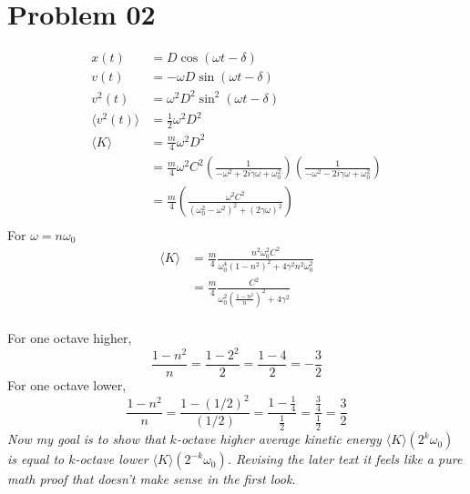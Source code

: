 \documentclass[12pt,letter]{article}
\begin{document}
\section*{Problem 02}
\begin{align*}
x(t)	&=  D \cos \left( \omega t - \delta \right)\\
v(t) &= - \omega D \sin( \omega t - \delta ) \\
v^2(t) &= \omega^2 D^2 \sin ^2 \left( \omega t - \delta \right) \\
\langle v^2 (t) \rangle &= \frac{1}{2 } \omega ^2 D ^2  \\
\langle K \rangle &= \frac{m}{4} \omega^2 D^2 \\ 
&= \frac{m}{4} \omega ^2 C^2 \left(\frac{1}{- \omega^2 + 2 i \gamma \omega + \omega_0^2} \right) \left(\frac{1}{- \omega^2 - 2 i \gamma \omega + \omega_0^2}\right)\\
&= \boxed{
 \frac{m}{4} \left(\frac{\omega ^2 C^2 }{(\omega_0^2 - \omega^2 )^2 + \left(2  \gamma \omega\right) ^2}\right) }\\
\end{align*}
For $\omega = n \omega_0$ 
\begin{align*}
	\langle K \rangle &= \frac{m}{4}
 \frac{n^2 \omega_0 ^2 C^2}{\omega_0^{4} \left(1 - n^2\right) ^2 + 4 \gamma^2 n^2 \omega_0 ^2}
	\\ &= \frac{m}{4} \frac{C^2}{\omega_0^2 \left(\frac{1 - n^2}{n}\right)^2 + 4 \gamma^2 } \\
\end{align*}

For one octave higher, 
\[
\frac{1 - n^2}{n} = \frac{1 - 2^2}{2} = \frac{1 - 4}{2} = - \frac{3}{2} 
\] 
For one octave lower, 
\[ \frac{1 - n^2}{n} = 
	\frac{1 - (1 / 2)^2 }{(1 / 2)} =  \frac{1 - \frac{1}{4}}{\frac{1}{2}} = \frac{\frac{3}{4}}{\frac{1}{2}} = \frac{3}{2} 
\]
\emph{Now my goal is to show that $k$-octave higher average kinetic energy $\langle K \rangle (2^{k} \omega_0 )$ is equal to $k$-octave lower $\langle K \rangle (2^{-k} \omega_0 ) $. Revising the later text it feels like a pure math proof that doesn't make sense in the first look.}
\end{document}
